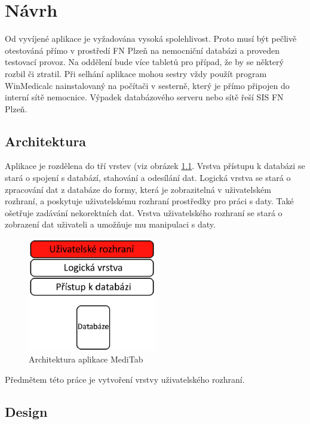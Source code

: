 \chapter{Návrh}
\label{ch:navrh}

Od vyvíjené aplikace je vyžadována vysoká spolehlivost. Proto musí být pečlivě otestováná přímo v prostředí FN Plzeň na nemocniční databázi a proveden testovací provoz. Na oddělení bude více tabletů pro případ, že by se některý rozbil či ztratil. Při selhání aplikace mohou sestry vždy použít program WinMedicalc nainstalovaný na počítači v sesterně, který je přímo připojen do interní sítě nemocnice. Výpadek databázového serveru nebo sítě řeší SIS FN Plzeň.

\section{Architektura}

Aplikace je rozdělena do tří vrstev (viz obrázek \ref{fig:architektura}. Vrstva přístupu k databázi se stará o spojení s databází, stahování a odesílání dat. Logická vrstva se stará o zpracování dat z databáze do formy, která je zobrazitelná v uživatelském rozhraní, a poskytuje uživatelskému rozhraní prostředky pro práci s daty. Také ošetřuje zadávání nekorektních dat. Vrstva uživatelského rozhraní se stará o zobrazení dat uživateli a umožňuje mu manipulaci s daty.

\begin{figure}[H]
	\centering
	\includegraphics[width=0.5\textwidth]{img/architektura.eps}
	\caption{Architektura aplikace MediTab}
  \label{fig:architektura}
\end{figure}

Předmětem této práce je vytvoření vrstvy uživatelského rozhraní.


\section{Design}

